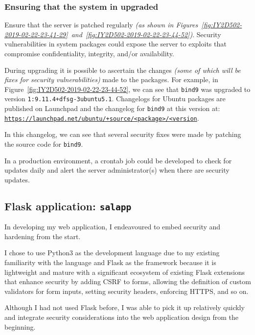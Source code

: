 \subsubsection{Ensuring that the system in upgraded}
Ensure that the server is patched regularly \textit{(as shown in Figures~\ref{fig:IY2D502-2019-02-22-23-41-29}~and~\ref{fig:IY2D502-2019-02-22-23-44-52})}. Security vulnerabilities in system packages could expose the server to exploits that compromise confidentiality, integrity, and/or availability.

During upgrading it is possible to ascertain the changes \textit{(some of which will be fixes for security vulnerabilities)} made to the packages. For example, in Figure~\ref{fig:IY2D502-2019-02-22-23-44-52}, we can see that \texttt{bind9} was upgraded to version \texttt{1:9.11.4+dfsg-3ubuntu5.1}. Changelogs for Ubuntu packages are published on Launchpad and the changelog for \texttt{bind9} at this version at:\\
\href{https://launchpad.net/ubuntu/+source/bind9/1:9.11.4+dfsg-3ubuntu5.1}{\texttt{https://launchpad.net/ubuntu/+source/<package>/<version}}.

In this changelog, we can see that several security fixes were made by patching the source code for \texttt{bind9}.

In a production environment, a crontab job could be developed to check for updates daily and alert the server administrator(s) when there are security updates.

\pagebreak
\subsection{Flask application: \texttt{salapp}}
In developing my web application, I endeavoured to embed security and hardening from the start.

I chose to use Python3 as the development language due to my existing familiarity with the language and Flask as the framework because it is lightweight and mature with a significant ecosystem of existing Flask extensions that enhance security by adding CSRF to forms, allowing the definition of custom validators for form inputs, setting security headers, enforcing HTTPS, and so on.

Although I had not used Flask before, I was able to pick it up relatively quickly and integrate security considerations into the web application design from the beginning.

